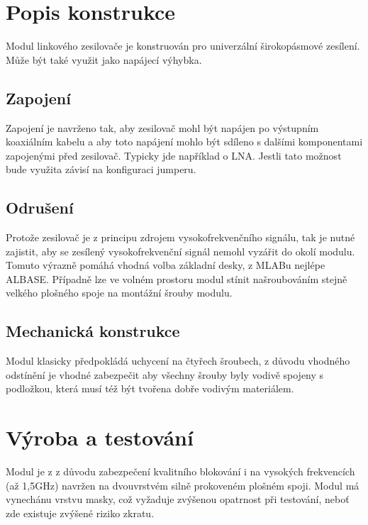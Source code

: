 \documentclass[12pt,a4paper,oneside]{article}
\begin{document}
\section{Popis konstrukce}

Modul linkového zesilovače je konstruován pro univerzální širokopásmové zesílení. Může být také využit jako napájecí výhybka. 

\subsection{Zapojení}

Zapojení je navrženo tak, aby zesilovač mohl být napájen po výstupním koaxiálním kabelu a aby toto napájení mohlo být sdíleno s dalšími komponentami zapojenými před zesilovač. Typicky jde například o LNA. Jestli tato možnost bude využita závisí na konfiguraci jumperu. 




\subsection{Odrušení}


Protože zesilovač je z principu zdrojem vysokofrekvenčního signálu, tak je nutné zajistit, aby se zesílený vysokofrekvenční signál nemohl vyzářit do okolí modulu.  Tomuto výrazně pomáhá vhodná volba základní desky, z MLABu nejlépe ALBASE. Případně lze ve volném prostoru modul stínit našroubováním stejně velkého plošného spoje na montážní šrouby modulu. 

\subsection{Mechanická konstrukce}

Modul klasicky předpokládá uchycení na čtyřech šroubech, z důvodu vhodného odstínění je vhodné zabezpečit aby všechny šrouby byly vodivě spojeny s podložkou, která musí též být tvořena dobře vodivým materiálem.  

\section{Výroba a testování}
Modul je z z důvodu zabezpečení kvalitního blokování i na vysokých frekvencích (až 1,5GHz) navržen na dvouvrstvém silně prokoveném plošném spoji. Modul má vynechánu vrstvu masky, což vyžaduje zvýšenou opatrnost při testování, neboť zde existuje zvýšené riziko zkratu. 
\end{document}
